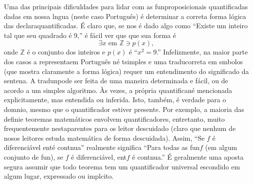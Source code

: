 Uma das principais dificuldades para lidar com as fun\coes proposicionais quantificadas dadas em nossa l\ih ngua (neste caso Portugu\^es) \'e determinar a correta forma l\'ogica das declara\coes quantificadas. \'E claro que, se nos \'e dado algo como ``Existe um inteiro tal que seu quadrado \'e $9$,'' \'e f\'acil ver que que sua forma \'e
\[
\exists x \textrm{ em } \mathbb{Z} \ni p(x),
\]
onde $\mathbb{Z}$ \'e o conjunto dos inteiros e $p(x)$ \'e ``$x^2=9$.'' Infelizmente, na maior parte dos casos a representa\cao em Portugu\^es n\ao \'e t\ao simples e uma tradu\cao correta em s\ih mbolos (que mostra claramente a forma l\'ogica)  requer um entendimento do significado  da senten\cc a. A tradu\cao n\ao pode ser feita de uma maneira determinada e f\'acil, ou de acordo a um simples algoritmo. \`As vezes, a pr\'opria quantifica\cao n\ao \'e mencionada explicitamente, mas entendida ou inferida. Isto, tamb\'em, \'e verdade para o dom\ih nio, mesmo que o quantificador estiver presente. Por exemplo,  a maioria das defini\coes e teoremas matem\'aticos envolvem quantificadores, entretanto, muito frequentemente n\ao est\ao aparentes para os leitor descuidado (claro que nenhum de nosos leitores estuda matem\'atica de forma descuidada). Assim, ``Se $f$ \'e diferenci\'avel ent\ao \'e cont\ih nua'' realmente significa ``Para todas as fun\coes $f$ (em algum conjunto de fun\cois), se $f$ \'e diferenci\'avel, ent\ao $f$ \'e cont\ih nua.'' \'E geralmente uma aposta segura assumir que todo teorema tem um quantificador universal escondido em algum lugar, expressado ou impl\ih cito.

